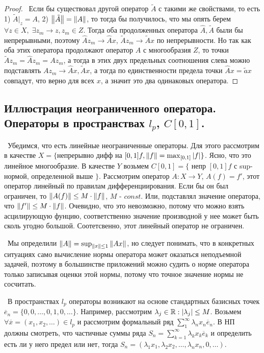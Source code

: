 \begin{proof}
\medskip 
\noindent\textbullet~Если бы существовал другой оператор $\tilde{A}$ с такими же свойствами, то есть 1) $\tilde{A}\big|_z = A$, 2) $\left\lVert\tilde{A}\right\rVert = \left\lVert A\right\rVert$, то 
тогда бы получилось, что мы опять берем $\forall z \in X, \; \exists z_m \to z, z_m \in Z$. Тогда оба продолженных оператора $\hat{A}, \tilde{A}$ были бы непрерывными, 
поэтому $\hat{A} z_m \to \hat{A} x$, $\tilde{A} z_m \to \tilde{A} x$ по непрерывности. Но так как оба этих оператора продолжают оператор $A$ с многообразия $Z$, то точки 
$\tilde{A}z_m = \hat{A} z_m = A z_m$, а тогда в этих двух предельных соотношения слева можно подставлять $A z_m \to \hat{A} x, \tilde{A} x$, а тогда по единственности 
предела точки $\hat{A} x = \tilde{a} x$ совпадут, что верно для всех $x$, а значит это два одинаковых оператора.
\end{proof}


\subsection*{Иллюстрация неограниченного оператора. Операторы в пространствах $l_p$, $C[0, 1]$.}

\noindent\checkmark~Убедимся, что есть линейные неограниченные операторы. Для этого рассмотрим в качестве $X = \{$непрерывно дифф на $[0, 1] f, \left\lVert f\right\rVert = \max_{[0, 1]}
\left\lvert f\right\rvert\}$. Ясно, что это линейное многообразие. В качестве $Y$ возьмем $C[0,1] = \{$ непр $[0, 1] f$ с sup-нормой, определенной выше $\}$. Рассмотрим оператор $A : X \to 
Y$, $A(f) = f'$, этот оператор линейный по правилам дифференциирования. Если бы он был ограничен, то $\left\lVert A(f)\right\rVert \le M \cdot \left\lVert f\right\rVert$, $M$ - $const$. Или, подставлял 
значение оператора, что $\left\lVert f'\right\rVert \le M \cdot \left\lVert f\right\rVert$. Очевидно, что это невозможно, потому что можно взять асцилирующую фунцию, соответственно значение производной 
у нее может быть сколь угодно большой. Соотетсвенно, этот линейный оператор не ограничен. 

\smallskip
\noindent\checkmark~Мы определили $\left\lVert A\right\rVert = \sup_{\left\lVert x\right\rVert \le 1} \left\lVert A x\right\rVert$, но следует понимать, что в конкретных ситуациях само вычисление нормы оператора может 
оказаться неподъемной задачей, поэтому в большинстве приложений можно судить о норме оператора только записывая оценки этой нормы, потому что точное значение нормы не 
сосчитать.

\bigskip 
\noindent\textbullet~В пространствах $l_p$ операторы возникают на основе стандартных базисных точек $\overline{e}_n = \{ 0, 0, \dots, 0, 1, 0, \dots \}$. Например, 
рассмотрим $\lambda_j \in \mathbb{R} : \left\lvert\lambda_j\right\rvert \le M$. Возьмем $\forall \overline{x} = (x_1, x_2, \dots) \in l_p$ и рассмотрим формальный ряд $\sum_1^\infty 
\lambda_n x_n \overline{e}_n$. В НП должны смотреть, что частичные суммы ряда $S_n = \sum_{k = 1}^\infty \lambda_k x_k \overline{e}_k$ и определить есть ли у него
предел или нет, тогда $S_n = (\lambda_1 x_1, \lambda_2 x_2, \dots, \lambda_n x_n, 0, \dots)$. 

